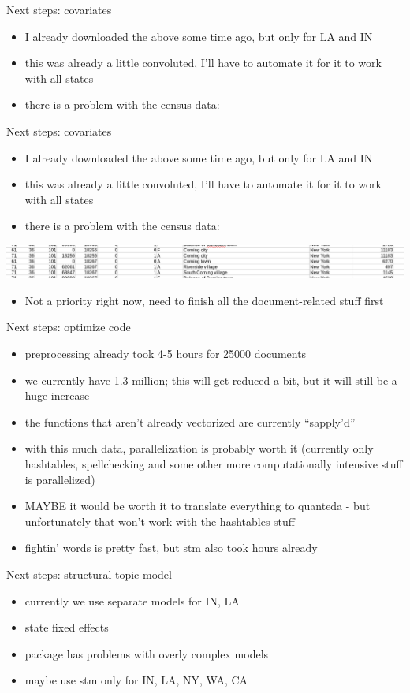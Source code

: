 \documentclass[12pt]{beamer}
\begin{document}
\begin{frame}{Next steps: covariates}
\begin{itemize}
	\item I already downloaded the above some time ago, but only for LA and IN
	\item this was already a little convoluted, I'll have to automate it for it to work with all states
	\item there is a problem with the census data:
\end{itemize}
\end{frame}

\begin{frame}{Next steps: covariates}
\begin{itemize}
	\item I already downloaded the above some time ago, but only for LA and IN
	\item this was already a little convoluted, I'll have to automate it for it to work with all states
	\item there is a problem with the census data:
\end{itemize}
\includegraphics[width=\linewidth]{census_problem.png}
\begin{itemize}
	\item Not a priority right now, need to finish all the document-related stuff first
\end{itemize}
\end{frame}

\begin{frame}{Next steps: optimize code}
\begin{itemize}
	\item preprocessing already took 4-5 hours for 25000 documents
	\item we currently have 1.3 million; this will get reduced a bit, but it will still be a huge increase
	\item the functions that aren't already vectorized are currently ``sapply'd''
	\item with this much data, parallelization is probably worth it (currently only hashtables, spellchecking and some other more computationally intensive stuff is parallelized)
	\item MAYBE it would be worth it to translate everything to quanteda - but unfortunately that won't work with the hashtables stuff
	\item fightin' words is pretty fast, but stm also took hours already
\end{itemize}
\end{frame}

\begin{frame}{Next steps: structural topic model}
\begin{itemize}
	\item currently we use separate models for IN, LA
	\item state fixed effects
	\item package has problems with overly complex models
	\item maybe use stm only for IN, LA, NY, WA, CA
\end{itemize}
\end{frame}
\end{document}
